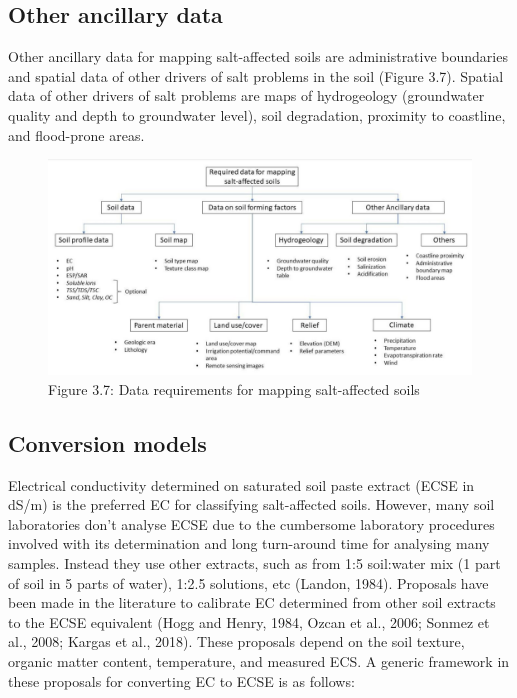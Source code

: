 \documentclass[
  10pt,
  b5paper,
]{book}
\begin{document}
\hypertarget{other-ancillary-data}{%
\subsection{Other ancillary data}\label{other-ancillary-data}}

Other ancillary data for mapping salt-affected soils are administrative boundaries and spatial data of other drivers of salt problems in the soil (Figure 3.7). Spatial data of other drivers of salt problems are maps of hydrogeology (groundwater quality and depth to groundwater level), soil degradation, proximity to coastline, and flood-prone areas.

\begin{figure}
\centering
\includegraphics{figures/images/Figure3.7.jpg}
\caption{Figure 3.7: Data requirements for mapping salt-affected soils}
\end{figure}

\hypertarget{conversion-models}{%
\subsection{Conversion models}\label{conversion-models}}

Electrical conductivity determined on saturated soil paste extract (ECSE in dS/m) is the preferred EC for classifying salt-affected soils. However, many soil laboratories don't analyse ECSE due to the cumbersome laboratory procedures involved with its determination and long turn-around time for analysing many samples. Instead they use other extracts, such as from 1:5 soil:water mix (1 part of soil in 5 parts of water), 1:2.5 solutions, etc (Landon, 1984). Proposals have been made in the literature to calibrate EC determined from other soil extracts to the ECSE equivalent (Hogg and Henry, 1984, Ozcan et al., 2006; Sonmez et al., 2008; Kargas et al., 2018). These proposals depend on the soil texture, organic matter content, temperature, and measured ECS. A generic framework in these proposals for converting EC to ECSE is as follows:
\end{document}
